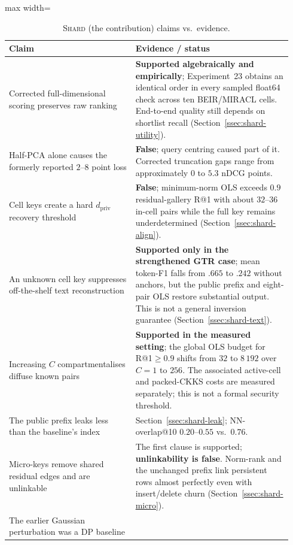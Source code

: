 \begin{table}[tbp]
\begin{singlespace}
\centering
\caption{\textsc{Shard} (the contribution) claims vs.\ evidence.}
\label{tab:shard-claims}
\footnotesize
\begin{adjustbox}{max width=\linewidth}
\begin{tabular}{@{}p{0.42\linewidth}p{0.52\linewidth}@{}}
\toprule
\textbf{Claim} & \textbf{Evidence / status} \\ \midrule
Corrected full-dimensional scoring preserves raw ranking &
\textbf{Supported algebraically and empirically}; Experiment~23 obtains an
identical order in every sampled float64 check across ten BEIR/MIRACL cells.
End-to-end quality still depends on shortlist recall
(Section~\ref{ssec:shard-utility}). \\
Half-PCA alone causes the formerly reported $2$--$8$ point loss &
\textbf{False}; query centring caused part of it. Corrected truncation gaps
range from approximately $0$ to $5.3$ nDCG points. \\
Cell keys create a hard $d_{\mathrm{priv}}$ recovery threshold &
\textbf{False}; minimum-norm OLS exceeds $0.9$ residual-gallery R@1 with
about $32$--$36$ in-cell pairs while the full key remains underdetermined
(Section~\ref{ssec:shard-align}). \\
An unknown cell key suppresses off-the-shelf text reconstruction &
\textbf{Supported only in the strengthened GTR case}; mean token-F1 falls
from $.665$ to $.242$ without anchors, but the public prefix and eight-pair OLS
restore substantial output. This is not a general inversion guarantee
(Section~\ref{ssec:shard-text}). \\
Increasing $C$ compartmentalises diffuse known pairs &
\textbf{Supported in the measured setting}; the global OLS budget for
R@1$\ge0.9$ shifts from $32$ to $8\,192$ over $C=1$ to $256$. The associated
active-cell and packed-CKKS costs are measured separately; this is not a
formal security threshold. \\
The public prefix leaks less than the baseline's index &
Section~\ref{ssec:shard-leak}; NN-overlap@10 $0.20$--$0.55$ vs.\ $0.76$. \\
Micro-keys remove shared residual edges and are unlinkable &
The first clause is supported; \textbf{unlinkability is false}. Norm-rank and
the unchanged prefix link persistent rows almost perfectly even with
insert/delete churn (Section~\ref{ssec:shard-micro}). \\
The earlier Gaussian perturbation was a DP baseline &

\end{tabular}
\end{adjustbox}
\end{singlespace}
\end{table}
